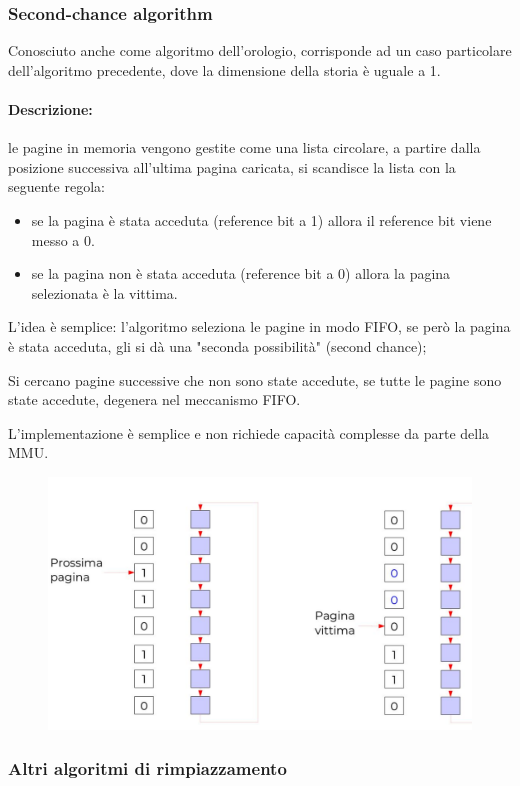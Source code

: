 \subsubsection{Second-chance algorithm}
Conosciuto anche come algoritmo dell'orologio, corrisponde ad un caso particolare dell'algoritmo precedente, dove la
dimensione della storia è uguale a 1.

\paragraph{Descrizione:} le pagine in memoria vengono gestite come una lista circolare, a partire dalla posizione successiva all'ultima pagina caricata, si scandisce la lista con la seguente regola:
\begin{itemize}
    \item se la pagina è stata acceduta (reference bit a 1) allora il reference bit viene messo a 0. 
    \item se la pagina non è stata acceduta (reference bit a 0) allora la pagina selezionata è la vittima.
\end{itemize}

L'idea è semplice: l'algoritmo seleziona le pagine in modo FIFO, se però la pagina è stata acceduta, gli si dà una "seconda possibilità" (second chance);

Si cercano pagine successive che non sono state accedute, se tutte le pagine sono state accedute, degenera nel meccanismo FIFO.

L'implementazione è semplice e non richiede capacità complesse da parte della MMU.

\begin{figure} [h]
    \centering
    \includegraphics[width=0.7\linewidth]{Images/Screenshot 2025-01-17 at 18-21-08 so-05-memoria - so-05-memoria.pdf.png}
\end{figure}

\subsubsection{Altri algoritmi di rimpiazzamento}
